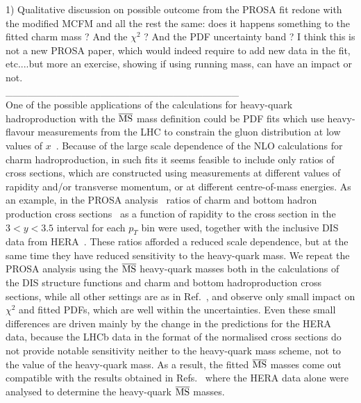 \documentclass[12pt,a4paper]{article}
\newcommand{\msbar}{\ensuremath{\overline{\rm MS}}\xspace}
\begin{document}
1) Qualitative discussion on possible outcome from the PROSA fit redone with the modified MCFM and all the rest the same: does it happens something to the fitted charm mass ? And the $\chi^2$ ? And the PDF uncertainty band ? 
I think this is not a new PROSA paper, which would indeed require to add new data in the fit, etc....but more an exercise, showing if using running mass, can have an impact or not. 
\\ 
\_\_\_\_\_\_\_\_\_\_\_\_\_\_\_\_\_\_\_\_\_\_\_\_\_\_\_\_\_\_\_\_
\\
One of the possible applications of the calculations for heavy-quark hadroproduction with the \msbar mass definition could be PDF fits which use heavy-flavour measurements from the LHC to constrain the gluon distribution at low values of $x$~\cite{Zenaiev:2015rfa,Gauld:2015yia,Gauld:2016kpd}. Because of the large scale dependence of the NLO calculations for charm hadroproduction, in such fits it seems feasible to include only ratios of cross sections, which are constructed using measurements at different values of rapidity and/or transverse momentum, or at different centre-of-mass energies. As an example, in the PROSA analysis~\cite{Zenaiev:2015rfa} ratios of charm and bottom hadron production cross sections~\cite{Aaij:2013mga,Aaij:2013noa} as a function of rapidity to the cross section in the $3 < y < 3.5$ interval for each $p_T$ bin were used, together with the inclusive DIS data from HERA~\cite{Aaron:2009aa,Abramowicz:1900rp,Abramowicz:2014zub}. These ratios afforded a reduced scale dependence, but at the same time they have reduced sensitivity to the heavy-quark mass. We repeat the PROSA analysis using the \msbar heavy-quark masses both in the calculations of the DIS structure functions and charm and bottom hadroproduction cross sections, while all other settings are as in Ref.~\cite{Zenaiev:2015rfa}, and observe only small impact on $\chi^2$ and fitted PDFs, which are well within the uncertainties. Even these small differences are driven mainly by the change in the predictions for the HERA data, because the LHCb data in the format of the normalised cross sections do not provide notable sensitivity neither to the heavy-quark mass scheme, not to the value of the heavy-quark mass. As a result, the fitted \msbar masses come out compatible with the results obtained in Refs.~\cite{Abramowicz:1900rp,Abramowicz:2014zub,Bertone:2016ywq,H1:2018flt} where the HERA data alone were analysed to determine the heavy-quark \msbar masses.
\\
\\
\end{document}
